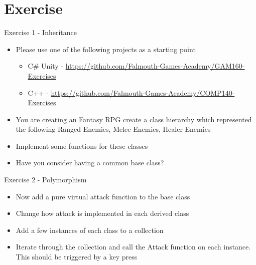 \part{Exercise}
\frame{\partpage}

\begin{frame}{Exercise 1 - Inheritance}
	\begin{itemize}
		\item Please use one of the following projects as a starting point
		\begin{itemize}
			\item C\# Unity - \url{https://github.com/Falmouth-Games-Academy/GAM160-Exercises}
			\item C++ - \url{https://github.com/Falmouth-Games-Academy/COMP140-Exercises}
		\end{itemize}
		\item You are creating an Fantasy RPG create a class hierarchy which represented the following Ranged Enemies, Melee Enemies, Healer Enemies
		\item Implement some functions for these classes
		\item Have you consider having a common base class?
	\end{itemize}
\end{frame}

\begin{frame}{Exercise 2 - Polymorphism}
	\begin{itemize}
		\item Now add a pure virtual attack function to the base class
		\item Change how attack is implemented in each derived class
		\item Add a few instances of each class to a collection
		\item Iterate through the collection and call the Attack function on each instance. This should be triggered by a key press
	\end{itemize}
\end{frame}